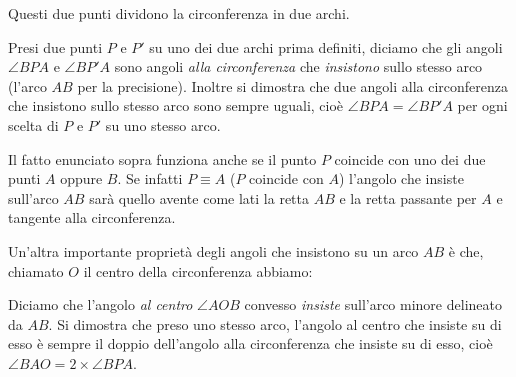 \documentclass[11pt]{scrartcl}
\begin{document}
	Questi due punti dividono la circonferenza in due archi.
	
	\begin{definition}
		Presi due punti $P$ e $P'$ su uno dei due archi prima definiti, diciamo che gli angoli $\angle BPA$ e $\angle BP'A$ sono angoli \textit{alla circonferenza} che \textit{insistono} sullo stesso arco (l'arco $AB$ per la precisione). Inoltre si dimostra che due angoli alla circonferenza che insistono sullo stesso arco sono sempre uguali, cioè $\angle BPA = \angle BP'A$ per ogni scelta di $P$ e $P'$ su uno stesso arco.
	\end{definition}
	
	\begin{remark}
		Il fatto enunciato sopra funziona anche se il punto $P$ coincide con uno dei due punti $A$ oppure $B$. Se infatti $P \equiv A$ ($P$ coincide con $A$) l'angolo che insiste sull'arco $AB$ sarà quello avente come lati la retta $AB$ e la retta passante per $A$ e tangente alla circonferenza.
	\end{remark}
	
	Un'altra importante proprietà degli angoli che insistono su un arco $AB$ è che, chiamato $O$ il centro della circonferenza abbiamo:
	
	\begin{definition}
		Diciamo che l'angolo \textit{al centro} $\angle AOB$ convesso \textit{insiste} sull'arco minore delineato da $AB$. Si dimostra che preso uno stesso arco, l'angolo al centro che insiste su di esso è sempre il doppio dell'angolo alla circonferenza che insiste su di esso, cioè $\angle BAO = 2 \times \angle BPA$.
	\end{definition}
	
\end{document}
